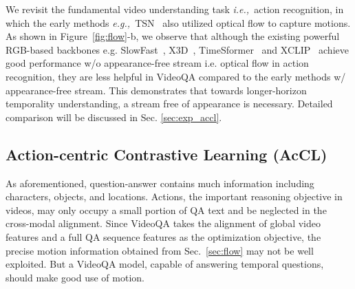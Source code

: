 \documentclass[sigconf]{acmart}
\newcommand{\ie}{\emph{i.e.,~}}
\newcommand{\eg}{\emph{e.g.,~}}
\begin{document}
We revisit the fundamental video understanding task \ie action recognition, in which the early methods \eg TSN~\cite{wang2016temporal, carreira2017quo} also utilized optical flow to capture motions. As shown in Figure~\ref{fig:flow}-b, we observe that although the existing powerful RGB-based backbones e.g. SlowFast~\cite{feichtenhofer2019slowfast}, X3D~\cite{feichtenhofer2020x3d}, TimeSformer~\cite{bertasius2021space} and XCLIP~\cite{ni2022expanding} achieve good performance w/o appearance-free stream i.e. optical flow in action recognition, they are less helpful in VideoQA compared to the early methods w/ appearance-free stream. This demonstrates that towards longer-horizon temporality understanding, a stream free of appearance is necessary. Detailed comparison will be discussed in Sec. \ref{sec:exp_accl}.




\subsection{Action-centric Contrastive Learning (AcCL)}
\label{sec:accl}
As aforementioned, question-answer contains much information including characters, objects, and locations. Actions, the important reasoning objective in videos, may only occupy a small portion of QA text and be neglected in the cross-modal alignment.
Since VideoQA takes the alignment of global video features and a full QA sequence features as the optimization objective, the precise motion information obtained from Sec.~\ref{sec:flow} may not be well exploited.
But a VideoQA model, capable of answering temporal questions, should make good use of motion.
\end{document}
